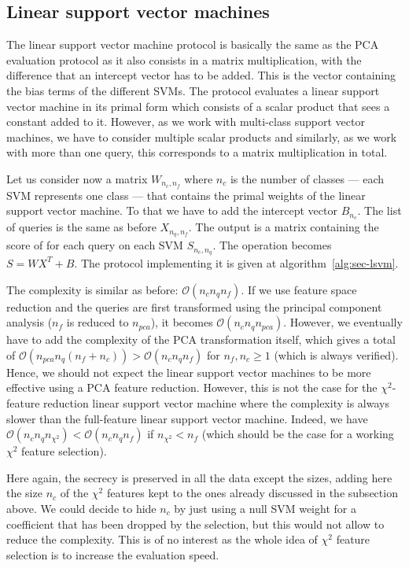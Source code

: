 \subsection{Linear support vector machines}
The linear support vector machine protocol is basically the same as the PCA evaluation protocol as it also consists in a matrix multiplication, with the difference that an intercept vector has to be added. This is the vector containing the bias terms of the different SVMs. The protocol evaluates a linear support vector machine in its primal form which consists of a scalar product that sees a constant added to it. However, as we work with multi-class support vector machines, we have to consider multiple scalar products and similarly, as we work with more than one query, this corresponds to a matrix multiplication in total.

Let us consider now a matrix $W_{n_c,n_f}$ where $n_c$ is the number of classes --- each SVM represents one class --- that contains the primal weights of the linear support vector machine. To that we have to add the intercept vector $B_{n_c}$. The list of queries is the same as before $X_{n_q , n_f}$. The output is a matrix containing the score of for each query on each SVM $S_{n_c,n_q}$. The operation becomes $S = WX^T + B$. The protocol implementing it is given at algorithm~\ref{alg:sec-lsvm}.

The complexity is similar as before: $\mathcal{O}(n_c n_q n_f)$. If we use feature space reduction and the queries are first transformed using the principal component analysis ($n_f$ is reduced to $n_{pca}$), it becomes $\mathcal{O}(n_c n_q n_{pca})$. However, we eventually have to add the complexity of the PCA transformation itself, which gives a total of $\mathcal{O}(n_{pca} n_q (n_f+n_c)) > \mathcal{O}(n_c n_q n_f)$ for $n_f,n_c \geq 1$ (which is always verified). Hence, we should not expect the linear support vector machines to be more effective using a PCA feature reduction. However, this is not the case for the $\chi^2$-feature reduction linear support vector machine where the complexity is always slower than the full-feature linear support vector machine. Indeed, we have $\mathcal{O}(n_c n_q n_{\chi^2}) < \mathcal{O}(n_c n_q n_f)$ if $n_{\chi^2} < n_f$ (which should be the case for a working $\chi^2$ feature selection).

Here again, the secrecy is preserved in all the data except the sizes, adding here the size $n_c$ of the $\chi^2$ features kept to the ones already discussed in the subsection above. We could decide to hide $n_c$ by just using a null SVM weight for a coefficient that has been dropped by the selection, but this would not allow to reduce the complexity. This is of no interest as the whole idea of $\chi^2$ feature selection is to increase the evaluation speed.


